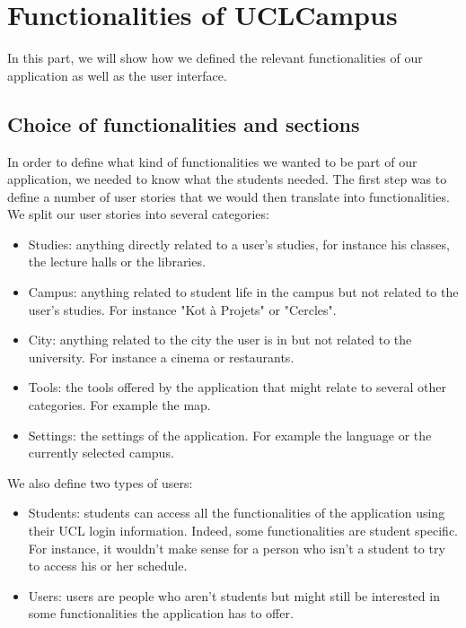 \documentclass[11pt, a4paper]{report}
\begin{document}
\chapter{Functionalities of UCLCampus}

In this part, we will show how we defined the relevant functionalities of our application as well as the user interface.

\section{Choice of functionalities and sections}



In order to define what kind of functionalities we wanted to be part of our application, we needed to know what the students needed. The first step was to define a number of user stories that we would then translate into functionalities.\\ 
We split our user stories into several categories:

\begin{itemize}

\item Studies: anything directly related to a user's studies, for instance his classes, the lecture halls or the libraries.
\item Campus: anything related to student life in the campus but not related to the user's studies. For instance "Kot à Projets" or "Cercles".
\item City: anything related to the city the user is in but not related to the university. For instance a cinema or restaurants.
\item Tools: the tools offered by the application that might relate to several other categories. For example the map.
\item Settings: the settings of the application. For example the language or the currently selected campus.

\end{itemize}

We also define two types of users:

\begin{itemize}

\item Students: students can access all the functionalities of the application using their UCL login information. Indeed, some functionalities are student specific. For instance, it wouldn't make sense for a person who isn't a student to try to access his or her schedule.

\item Users: users are people who aren't students but might still be interested in some functionalities the application has to offer. 

\end{itemize}
\end{document}
